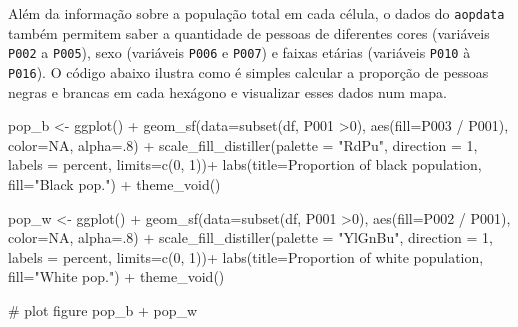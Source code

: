 \documentclass[
  letterpaper,
  DIV=11,
  numbers=noendperiod]{scrreprt}
\newenvironment{Shaded}{\begin{snugshade}}{\end{snugshade}}
\newcommand{\AttributeTok}[1]{\textcolor[rgb]{0.40,0.45,0.13}{#1}}
\newcommand{\CommentTok}[1]{\textcolor[rgb]{0.37,0.37,0.37}{#1}}
\newcommand{\ConstantTok}[1]{\textcolor[rgb]{0.56,0.35,0.01}{#1}}
\newcommand{\DecValTok}[1]{\textcolor[rgb]{0.68,0.00,0.00}{#1}}
\newcommand{\FunctionTok}[1]{\textcolor[rgb]{0.28,0.35,0.67}{#1}}
\newcommand{\NormalTok}[1]{\textcolor[rgb]{0.00,0.23,0.31}{#1}}
\newcommand{\OtherTok}[1]{\textcolor[rgb]{0.00,0.23,0.31}{#1}}
\newcommand{\SpecialCharTok}[1]{\textcolor[rgb]{0.37,0.37,0.37}{#1}}
\newcommand{\StringTok}[1]{\textcolor[rgb]{0.13,0.47,0.30}{#1}}
\begin{document}
Além da informação sobre a população total em cada célula, o dados do
\texttt{aopdata} também permitem saber a quantidade de pessoas de
diferentes cores (variáveis \texttt{P002} a \texttt{P005}), sexo
(variáveis \texttt{P006} e \texttt{P007}) e faixas etárias (variáveis
\texttt{P010} à \texttt{P016}). O código abaixo ilustra como é simples
calcular a proporção de pessoas negras e brancas em cada hexágono e
visualizar esses dados num mapa.

\begin{Shaded}
\begin{Highlighting}[]
\NormalTok{pop\_b }\OtherTok{\textless{}{-}} \FunctionTok{ggplot}\NormalTok{() }\SpecialCharTok{+}
  \FunctionTok{geom\_sf}\NormalTok{(}\AttributeTok{data=}\FunctionTok{subset}\NormalTok{(df, P001 }\SpecialCharTok{\textgreater{}}\DecValTok{0}\NormalTok{), }\FunctionTok{aes}\NormalTok{(}\AttributeTok{fill=}\NormalTok{P003 }\SpecialCharTok{/}\NormalTok{ P001), }\AttributeTok{color=}\ConstantTok{NA}\NormalTok{, }\AttributeTok{alpha=}\NormalTok{.}\DecValTok{8}\NormalTok{) }\SpecialCharTok{+}
  \FunctionTok{scale\_fill\_distiller}\NormalTok{(}\AttributeTok{palette =} \StringTok{"RdPu"}\NormalTok{, }\AttributeTok{direction =} \DecValTok{1}\NormalTok{, }\AttributeTok{labels =}\NormalTok{ percent, }\AttributeTok{limits=}\FunctionTok{c}\NormalTok{(}\DecValTok{0}\NormalTok{, }\DecValTok{1}\NormalTok{))}\SpecialCharTok{+}
  \FunctionTok{labs}\NormalTok{(}\AttributeTok{title=}\StringTok{\textquotesingle{}Proportion of black population\textquotesingle{}}\NormalTok{, }\AttributeTok{fill=}\StringTok{"Black pop."}\NormalTok{) }\SpecialCharTok{+}
  \FunctionTok{theme\_void}\NormalTok{()}

\NormalTok{pop\_w }\OtherTok{\textless{}{-}} \FunctionTok{ggplot}\NormalTok{() }\SpecialCharTok{+}
  \FunctionTok{geom\_sf}\NormalTok{(}\AttributeTok{data=}\FunctionTok{subset}\NormalTok{(df, P001 }\SpecialCharTok{\textgreater{}}\DecValTok{0}\NormalTok{), }\FunctionTok{aes}\NormalTok{(}\AttributeTok{fill=}\NormalTok{P002 }\SpecialCharTok{/}\NormalTok{ P001), }\AttributeTok{color=}\ConstantTok{NA}\NormalTok{, }\AttributeTok{alpha=}\NormalTok{.}\DecValTok{8}\NormalTok{) }\SpecialCharTok{+}
  \FunctionTok{scale\_fill\_distiller}\NormalTok{(}\AttributeTok{palette =} \StringTok{"YlGnBu"}\NormalTok{, }\AttributeTok{direction =} \DecValTok{1}\NormalTok{, }\AttributeTok{labels =}\NormalTok{ percent, }\AttributeTok{limits=}\FunctionTok{c}\NormalTok{(}\DecValTok{0}\NormalTok{, }\DecValTok{1}\NormalTok{))}\SpecialCharTok{+}
  \FunctionTok{labs}\NormalTok{(}\AttributeTok{title=}\StringTok{\textquotesingle{}Proportion of white population\textquotesingle{}}\NormalTok{, }\AttributeTok{fill=}\StringTok{"White pop."}\NormalTok{) }\SpecialCharTok{+}
  \FunctionTok{theme\_void}\NormalTok{()}

\CommentTok{\# plot figure}
\NormalTok{pop\_b }\SpecialCharTok{+}\NormalTok{ pop\_w}
\end{Highlighting}
\end{Shaded}
\end{document}

